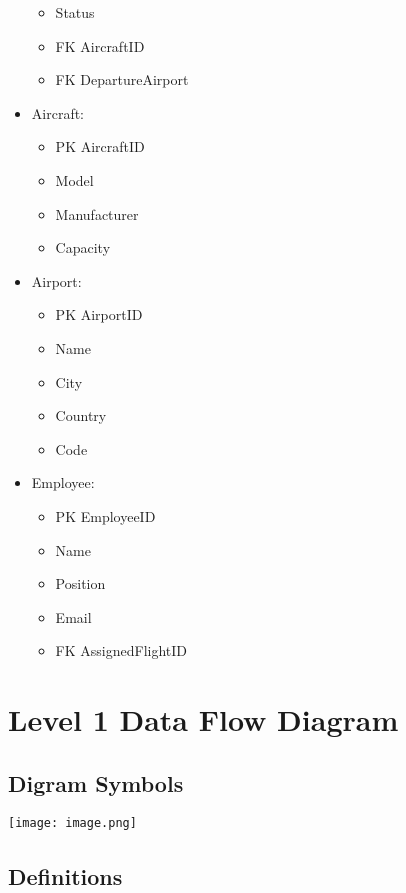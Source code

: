 \documentclass{article}
\begin{document}
\begin{itemize}
\begin{itemize}
    \item       Status
    \item FK    AircraftID
    \item FK    DepartureAirport
    \end{itemize}
\item Aircraft:
    \begin{itemize}
    \item PK    AircraftID
    \item       Model
    \item       Manufacturer
    \item       Capacity
    \end{itemize}
\item Airport:
    \begin{itemize}
    \item PK    AirportID
    \item       Name
    \item       City
    \item       Country
    \item       Code
    \end{itemize}
\item Employee:
    \begin{itemize}
    \item PK    EmployeeID
    \item       Name
    \item       Position
    \item       Email
    \item FK    AssignedFlightID
    \end{itemize}
\end{itemize}

\section{Level 1 Data Flow Diagram}

\subsection{Digram Symbols}

\texttt{[image: image.png]}

\subsection{Definitions}
\end{document}
